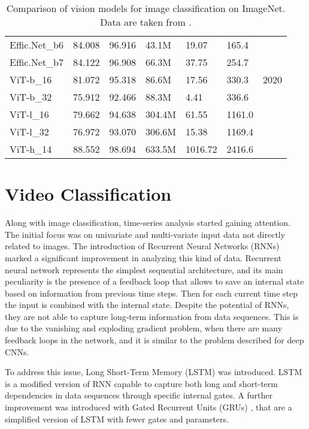 \begin{table}[ht]
\begin{tabular}{l|c|c|l|l|l|c}
        Effic.Net\_b6 & 84.008 & 96.916 & 43.1M & 19.07 & 165.4 & \\
        Effic.Net\_b7 & 84.122 & 96.908 & 66.3M & 37.75 & 254.7 & \\
        \hline
        ViT-b\_16 & 81.072 & 95.318 & 86.6M & 17.56 & 330.3 & 2020 \\
        ViT-b\_32 & 75.912 & 92.466 & 88.3M & 4.41 & 336.6 & \\
        ViT-l\_16 & 79.662 & 94.638 & 304.4M & 61.55 & 1161.0 & \\
        ViT-l\_32 & 76.972 & 93.070 & 306.6M & 15.38 & 1169.4 & \\
        ViT-h\_14 & 88.552 & 98.694 & 633.5M & 1016.72 & 2416.6 & \\
        \hline
    \end{tabular}
    \caption{Comparison of vision models for image classification on ImageNet.
    Data are taken from 
    \cites{pytorch_alexnet}{pytorch_vgg}{pytorch_inception_v3}{pytorch_resnet}{densenet}
    {pytorch_efficientnet}{pytorch_vision_transformer}.}
    \label{tab:cnn_comparison}
\end{table}


\section{Video Classification}
Along with image classification, time-series analysis started gaining attention. 
The initial focus was on univariate and multi-variate input 
data not directly related to images. 
The introduction of Recurrent Neural Networks (RNNs) \cite{rnn} marked a 
significant improvement in analyzing this kind of data. Recurrent neural 
network represents the simplest sequential architecture, and its main 
peculiarity is the presence of a feedback loop that allows to save an internal 
state based on information from previous time steps. Then for each current time 
step the input is combined with the internal state.
Despite the potential of RNNs, they are not able to capture long-term 
information from data sequences. This is due to the vanishing and exploding 
gradient problem, when there are many feedback loops in the network, and it is 
similar to the problem described for deep CNNs.

To address this issue, Long Short-Term Memory (LSTM) \cite{lstm} was introduced. 
LSTM is a modified version of RNN capable to capture both long and short-term 
dependencies in data sequences through specific internal gates. 
A further improvement was introduced with Gated Recurrent Units (GRUs) 
\cite{gru}, that are a simplified version of LSTM with fewer gates and 
parameters.

